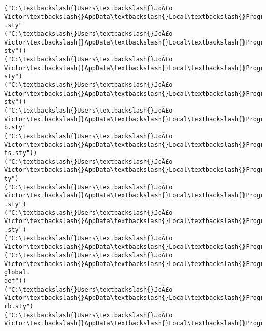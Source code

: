 \documentclass[11pt]{article}
\begin{document}
\begin{Verbatim}[commandchars=\\\{\}]
("C:\textbackslash{}Users\textbackslash{}JoÃ£o Victor\textbackslash{}AppData\textbackslash{}Local\textbackslash{}Programs\textbackslash{}MiKTeX\textbackslash{}tex/latex/amsmath\textbackslash{}amstext
.sty"
("C:\textbackslash{}Users\textbackslash{}JoÃ£o Victor\textbackslash{}AppData\textbackslash{}Local\textbackslash{}Programs\textbackslash{}MiKTeX\textbackslash{}tex/latex/amsmath\textbackslash{}amsgen.
sty"))
("C:\textbackslash{}Users\textbackslash{}JoÃ£o Victor\textbackslash{}AppData\textbackslash{}Local\textbackslash{}Programs\textbackslash{}MiKTeX\textbackslash{}tex/latex/amsmath\textbackslash{}amsbsy.
sty")
("C:\textbackslash{}Users\textbackslash{}JoÃ£o Victor\textbackslash{}AppData\textbackslash{}Local\textbackslash{}Programs\textbackslash{}MiKTeX\textbackslash{}tex/latex/amsmath\textbackslash{}amsopn.
sty"))
("C:\textbackslash{}Users\textbackslash{}JoÃ£o Victor\textbackslash{}AppData\textbackslash{}Local\textbackslash{}Programs\textbackslash{}MiKTeX\textbackslash{}tex/latex/amsfonts\textbackslash{}amssym
b.sty"
("C:\textbackslash{}Users\textbackslash{}JoÃ£o Victor\textbackslash{}AppData\textbackslash{}Local\textbackslash{}Programs\textbackslash{}MiKTeX\textbackslash{}tex/latex/amsfonts\textbackslash{}amsfon
ts.sty"))
("C:\textbackslash{}Users\textbackslash{}JoÃ£o Victor\textbackslash{}AppData\textbackslash{}Local\textbackslash{}Programs\textbackslash{}MiKTeX\textbackslash{}tex/latex/base\textbackslash{}textcomp.s
ty")
("C:\textbackslash{}Users\textbackslash{}JoÃ£o Victor\textbackslash{}AppData\textbackslash{}Local\textbackslash{}Programs\textbackslash{}MiKTeX\textbackslash{}tex/latex/upquote\textbackslash{}upquote
.sty")
("C:\textbackslash{}Users\textbackslash{}JoÃ£o Victor\textbackslash{}AppData\textbackslash{}Local\textbackslash{}Programs\textbackslash{}MiKTeX\textbackslash{}tex/latex/eurosym\textbackslash{}eurosym
.sty")
("C:\textbackslash{}Users\textbackslash{}JoÃ£o Victor\textbackslash{}AppData\textbackslash{}Local\textbackslash{}Programs\textbackslash{}MiKTeX\textbackslash{}tex/latex/ucs\textbackslash{}ucs.sty"
("C:\textbackslash{}Users\textbackslash{}JoÃ£o Victor\textbackslash{}AppData\textbackslash{}Local\textbackslash{}Programs\textbackslash{}MiKTeX\textbackslash{}tex/latex/ucs\textbackslash{}uni-global.
def"))
("C:\textbackslash{}Users\textbackslash{}JoÃ£o Victor\textbackslash{}AppData\textbackslash{}Local\textbackslash{}Programs\textbackslash{}MiKTeX\textbackslash{}tex/latex/fancyvrb\textbackslash{}fancyv
rb.sty")
("C:\textbackslash{}Users\textbackslash{}JoÃ£o Victor\textbackslash{}AppData\textbackslash{}Local\textbackslash{}Programs\textbackslash{}MiKTeX\textbackslash{}tex/latex/grffile\textbackslash{}grffile

\end{Verbatim}
\end{document}
